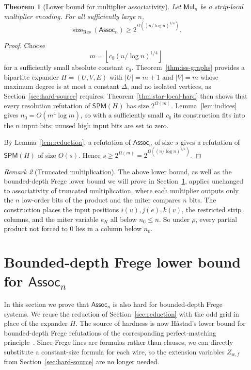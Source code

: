 \documentclass[11pt]{article}
\newtheorem{theorem}{Theorem}[section]
\theoremstyle{definition}
\theoremstyle{remark}
\newtheorem{remark}[theorem]{Remark}
\newcommand{\Assoc}{\mathsf{Assoc}}
\newcommand{\Mul}{\mathsf{Mul}}
\newcommand{\SPM}{\mathsf{SPM}}
\newcommand{\sizeRes}{\operatorname{size}_{\mathrm{Res}}}
\begin{document}
\begin{theorem}[Lower bound for multiplier associativity]
\label{thm:main}
Let $\Mul_n$ be a strip-local multiplier encoding. For all sufficiently large $n$,
\[
\sizeRes(\Assoc_n)\ge 2^{\Omega((n/\log n)^{1/4})}.
\]
\end{theorem}

\begin{proof}
Choose
\[
m=\left\lfloor c_0(n/\log n)^{1/4}\right\rfloor
\]
for a sufficiently small absolute constant $c_0$. Theorem~\ref{thm:iss-graphs} provides a bipartite expander $H=(U,V,E)$ with $|U|=m+1$ and $|V|=m$ whose maximum degree is at most a constant $\Delta$, and no isolated vertices, as Section~\ref{sec:hard-source} requires. Theorem~\ref{thm:star-local-hard} then shows that every resolution refutation of $\SPM(H)$ has size $2^{\Omega(m)}$. 
Lemma~\ref{lem:indices} gives $n_0=O(m^4\log m)$, so with a sufficiently small $c_0$ its construction fits into the $n$
input bits; unused high input bits are set to zero.

By Lemma~\ref{lem:reduction}, a refutation of $\Assoc_n$ of size $s$ gives a refutation of $\SPM(H)$ of size $O(s)$. Hence $s\ge 2^{\Omega(m)}=2^{\Omega((n/\log n)^{1/4})}$.
\end{proof}

\begin{remark}[Truncated multiplication]
\label{rem:truncated}
The above lower bound, as well as the bounded-depth Frege lower bound we will prove in Section~\ref{sec:frege}, applies unchanged to associativity of truncated multiplication, where each multiplier outputs only the $n$ low-order bits of
the product and the miter compares $n$ bits. The construction places the
input positions $i(u), j(e), k(v)$, the restricted strip columns, and the
miter variable $e_K$ all below $n_0 \le n$. So under $\rho$, every partial product
not forced to $0$ lies in a column below $n_0$.
\end{remark}

\section{Bounded-depth Frege lower bound for \texorpdfstring{$\Assoc_n$}{Assoc\_n}}
\label{sec:frege}

In this section we prove that $\Assoc_n$ is also hard for bounded-depth Frege systems. We reuse the reduction of Section~\ref{sec:reduction} with the odd grid in place of the expander $H$. The source of hardness is now H\r{a}stad's lower bound for bounded-depth Frege refutations of the corresponding perfect-matching principle~\cite{hastad-php}. Since Frege lines are formulas rather than clauses, we can directly substitute a constant-size formula for each wire, so the extension variables $Z_{w,f}$ from Section~\ref{sec:hard-source} are no longer needed.
\end{document}

